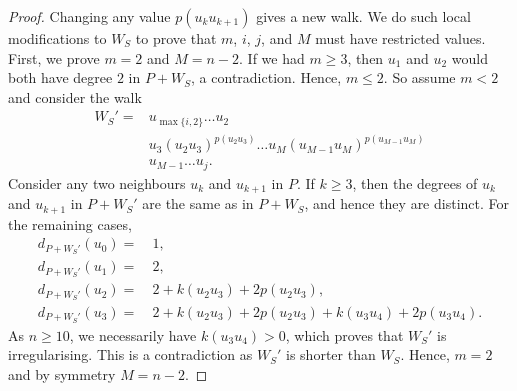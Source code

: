 \documentclass[a4paper,11pt,dvipsnames]{elsarticle}
\begin{document}
\begin{proof}
Changing any value $p(u_ku_{k+1})$ gives a new walk.
We do such local modifications to $W_S$ to prove that $m$, $i$, $j$, and $M$ must have restricted values.
First, we prove $m=2$ and $M=n-2$. If we had $m\ge 3$, then $u_1$ and $u_2$ would both have degree $2$ in $P+W_S$,
a contradiction. Hence, $m\le 2$. So assume $m<2$ and consider the walk 
\begin{align*}
    W_S' = & u_{\max \{i,2\}}\dots u_2\\
    &u_{3}(u_2u_3)^{p(u_2u_{3})}\dots u_{M}(u_{M-1}u_M)^{p(u_{M-1}u_M)}\\
    &u_{M-1}\dots u_j.
\end{align*}
Consider any two neighbours $u_k$ and $u_{k+1}$ in $P$. If $k\ge 3$, then the degrees of $u_k$ and $u_{k+1}$ in $P+W_S'$
are the same as in $P+W_S$, and hence they are distinct. For the remaining cases,
\begin{align*}
    d_{P+W_S'}(u_0)=& ~1,\\
    d_{P+W_S'}(u_1)=& ~2,\\
    d_{P+W_S'}(u_2)=& ~2+k(u_2u_3)+2p(u_2u_3),\\
    d_{P+W_S'}(u_3)=& ~2+k(u_2u_3)+2p(u_2u_3)+k(u_3u_4)+2p(u_3u_4).
\end{align*}
As $n\ge 10$, we necessarily have $k(u_3u_4)>0$, which proves that $W_S'$ is irregularising. This is a contradiction as $W_S'$ is shorter
than $W_S$. Hence, $m=2$ and by symmetry $M=n-2$.



\end{proof}
\end{document}
